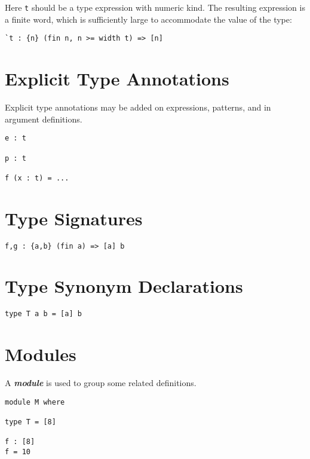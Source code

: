 Here \texttt{t} should be a type expression with numeric kind. The
resulting expression is a finite word, which is sufficiently large to
accommodate the value of the type:

\begin{verbatim}
`t : {n} (fin n, n >= width t) => [n]
\end{verbatim}

\hypertarget{explicit-type-annotations}{%
\section{Explicit Type Annotations}\label{explicit-type-annotations}}

Explicit type annotations may be added on expressions, patterns, and in
argument definitions.

\begin{verbatim}
e : t

p : t

f (x : t) = ...
\end{verbatim}

\hypertarget{type-signatures}{%
\section{Type Signatures}\label{type-signatures}}

\begin{verbatim}
f,g : {a,b} (fin a) => [a] b
\end{verbatim}

\hypertarget{type-synonym-declarations}{%
\section{Type Synonym Declarations}\label{type-synonym-declarations}}

\begin{verbatim}
type T a b = [a] b
\end{verbatim}

\hypertarget{modules}{%
\section{Modules}\label{modules}}

A \textbf{\emph{module}} is used to group some related definitions.

\begin{verbatim}
module M where

type T = [8]

f : [8]
f = 10
\end{verbatim}

